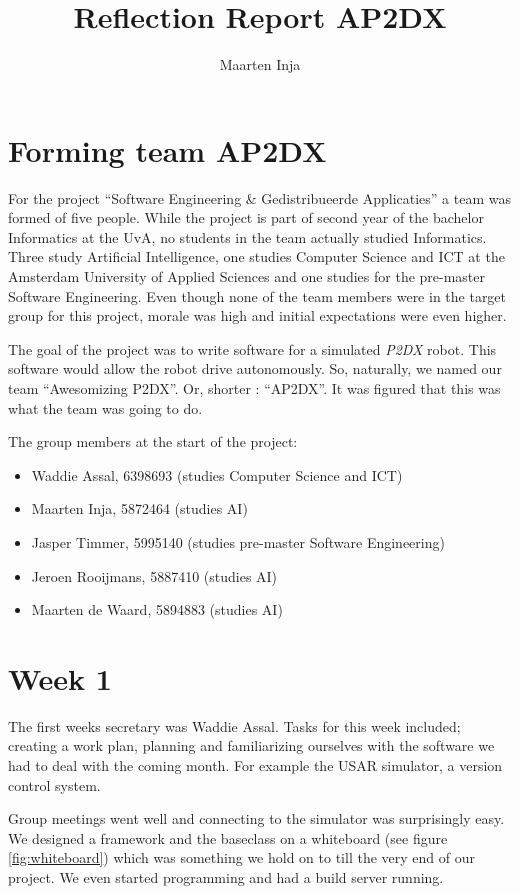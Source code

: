 \documentclass[a4paper,10pt]{article}
\title{Reflection Report AP2DX}
\author{Maarten Inja}
\begin{document}
\maketitle

\section{Forming team AP2DX}
For the project ``Software Engineering \& Gedistribueerde Applicaties'' a team was formed of five people. 
While the project is part of second year of the bachelor Informatics at the UvA, no students in the 
team actually studied Informatics. Three study Artificial Intelligence, one studies 
Computer Science and ICT at the Amsterdam University of Applied Sciences and one studies for the 
pre-master Software Engineering. Even though none of the team members were in the target group for this
project, morale was high and initial expectations were even higher.

The goal of the project was to write software for a simulated \emph{P2DX} robot. This software would
allow the robot drive autonomously. So, naturally, we named our team ``Awesomizing P2DX''. Or, shorter
: ``AP2DX''. It was
figured that this was what the team was going to do. 

The group members at the start of the project:
\begin{itemize}
    \item Waddie Assal, 6398693 (studies Computer Science and ICT) 
    \item Maarten Inja, 5872464 (studies AI)
    \item Jasper Timmer, 5995140 (studies pre-master Software Engineering)
    \item Jeroen Rooijmans, 5887410 (studies AI)
    \item Maarten de Waard, 5894883 (studies AI)
\end{itemize}

\section{Week 1}
The first weeks secretary was Waddie Assal. Tasks for this week included; creating a work plan, planning
and familiarizing ourselves with the software we had to deal with the coming month. For example the USAR simulator, 
a version control system. 

Group meetings went well and connecting to the simulator was surprisingly easy. We designed a framework and the
baseclass on a whiteboard (see figure \ref{fig:whiteboard}) which was something we hold on to till the very end
of our project. We even started programming and had a build server running.
\end{document}
